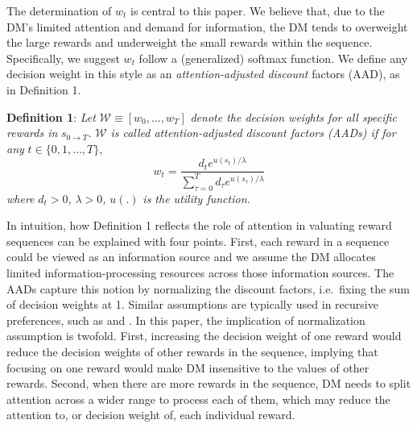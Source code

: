 \documentclass[
  12pt,
]{article}
\begin{document}
The determination of \(w_t\) is central to this paper. We believe that,
due to the DM's limited attention and demand for information, the DM
tends to overweight the large rewards and underweight the small rewards
within the sequence. Specifically, we suggest \(w_t\) follow a
(generalized) softmax function. We define any decision weight in this
style as an \emph{attention-adjusted discount} factors (AAD), as in
Definition 1.

\noindent \textbf{Definition 1}: \emph{Let}
\(\mathcal{W}\equiv[w_0,...,w_T]\) \emph{denote the decision weights for
all specific rewards in} \(s_{0\rightarrow T}\)\emph{.} \(\mathcal{W}\)
\emph{is called attention-adjusted discount factors (AADs) if for any}
\(t\in\{0,1,…,T\}\),\[\tag{1}
w_t = \frac{d_te^{u(s_t)/\lambda}}{\sum_{\tau=0}^T d_\tau e^{u(s_\tau)/\lambda}} 
\]\emph{where} \(d_t > 0\)\emph{,} \(\lambda>0\)\emph{,} \(u(.)\)
\emph{is the utility function.}

In intuition, how Definition 1 reflects the role of attention in
valuating reward sequences can be explained with four points. First,
each reward in a sequence could be viewed as an information source and
we assume the DM allocates limited information-processing resources
across those information sources. The AADs capture this notion by
normalizing the discount factors, i.e.~fixing the sum of decision
weights at 1. Similar assumptions are typically used in recursive
preferences, such as \citet{epstein1989substitution} and
\citet{weil1990nonexpected}. In this paper, the implication of
normalization assumption is twofold. First, increasing the decision
weight of one reward would reduce the decision weights of other rewards
in the sequence, implying that focusing on one reward would make DM
insensitive to the values of other rewards. Second, when there are more
rewards in the sequence, DM needs to split attention across a wider
range to process each of them, which may reduce the attention to, or
decision weight of, each individual reward.
\end{document}
